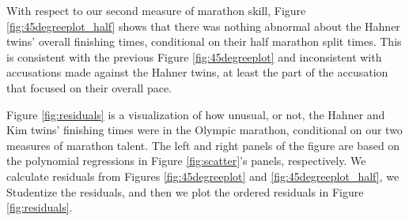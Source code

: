 \documentclass[12pt,titlepage]{article}
\begin{document}
With respect to our second measure of marathon skill, Figure
\ref{fig:45degreeplot_half} shows that there was nothing abnormal
about the Hahner twins' overall finishing times, conditional on their
half marathon split times.  This is consistent with the previous
Figure \ref{fig:45degreeplot} and inconsistent with accusations made
against the Hahner twins, at least the part of the accusation that
focused on their overall pace.

Figure \ref{fig:residuals} is a visualization of how unusual, or not,
the Hahner and Kim twins' finishing times were in the Olympic
marathon, conditional on our two measures of marathon talent.  The
left and right panels of the figure are based on the polynomial
regressions in Figure \ref{fig:scatter}'s panels, respectively.  We
calculate residuals from Figures \ref{fig:45degreeplot} and
\ref{fig:45degreeplot_half}, we Studentize the residuals, and then we
plot the ordered residuals in Figure \ref{fig:residuals}.
\end{document}
